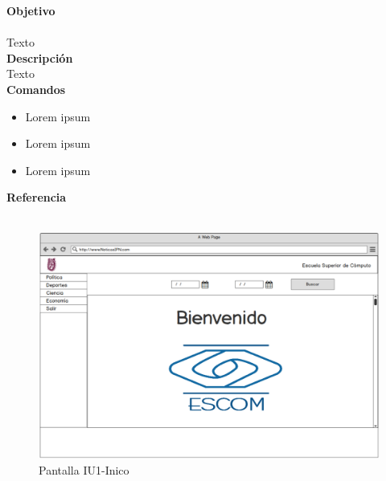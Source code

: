  

\Large{\textbf{Objetivo}}\\\\
\normalsize{Texto}\\

	

\Large{\textbf{Descripción}}\\
\normalsize{Texto}\\

\Large{\textbf{Comandos}}\\
\normalsize{}

\begin{itemize}
	\item Lorem ipsum
	\item Lorem ipsum
	\item Lorem ipsum
\end{itemize}


\Large{\textbf{Referencia}}\\\\
\normalsize{}

\begin{figure}[h]
  \centering
	\includegraphics[scale=.3]{imagenes/Pantallas/UI1}
  \caption{Pantalla IU1-Inico}
  \label{fig:IU1}
\end{figure}
